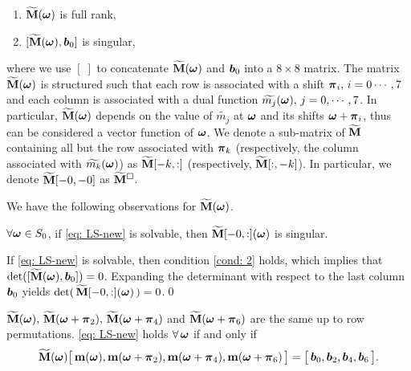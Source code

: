 \begin{enumerate}[leftmargin=.5in]
\item[\mylabel{cond: 1}{(\ref{sec: solve-quincunx}.i)}] $\widetilde{\mathbf{M}}(\boldsymbol{\omega})$ is full rank,
\item[\mylabel{cond: 2}{(\ref{sec: solve-quincunx}.ii)}] $[\widetilde{\mathbf{M}}(\boldsymbol{\omega}), \boldsymbol{b}_0]$ is singular,
\end{enumerate}
where we use $[\;]$ to concatenate $\widetilde{\mathbf{M}}(\boldsymbol{\omega})$ and $\boldsymbol{b}_0$ into a $8\times 8$ matrix. %
The matrix $\widetilde{\mathbf{M}}(\boldsymbol{\omega})$ is structured such that each row is associated with a shift $\boldsymbol{\pi}_i,\,i=0\cdots,7$ and each column is associated with a dual function $\widetilde{m_{j}}(\boldsymbol{\omega}),\,j=0,\cdots,7$. In particular, $\widetilde{\mathbf{M}}(\boldsymbol{\omega})$ depends on the value of $\widetilde{m_j}$ at $\boldsymbol{\omega}$ and its shifts $\boldsymbol{\omega}+\boldsymbol{\pi}_i$, thus can be considered a vector function of $\boldsymbol{\omega}$. We denote a sub-matrix of $\widetilde{\mathbf{M}}$ containing all but the row associated with $\boldsymbol{\pi}_k$ (respectively, the column associated with $\widetilde{m_{k}}(\boldsymbol{\omega})$) as $\widetilde{\mathbf{M}}[-k,:]$ (respectively, $\widetilde{\mathbf{M}}[:,-k]$).
In particular, we denote $\widetilde{\mathbf{M}}[-0,-0]$ as $\widetilde{\mathbf{M}}^{\Box}$.

We have the following observations for $\widetilde{\mathbf{M}}(\boldsymbol{\omega})$.
\begin{lemma}\label{lem: subM-singular}
 $\forall \boldsymbol{\omega}\in S_0$, if \eqref{eq: LS-new} is solvable, then $\widetilde{\mathbf{M}}[-0,:](\boldsymbol{\omega})$ is singular.
\end{lemma}
If \eqref{eq: LS-new} is solvable, then condition \ref{cond: 2} holds, which implies that $\det([\widetilde{\mathbf{M}}(\boldsymbol{\omega}),\boldsymbol{b}_0]) = 0$. Expanding the determinant with respect to the last column $\boldsymbol{b}_0$ yields $\det(\,\widetilde{\mathbf{M}}[-0,:](\boldsymbol{\omega})\,) = 0$.\qed

\begin{lemma}\label{lem: M-symmetry}
$\widetilde{\mathbf{M}}(\boldsymbol{\omega}),\,\widetilde{\mathbf{M}}(\boldsymbol{\omega}+\boldsymbol{\pi}_2),\,\widetilde{\mathbf{M}}(\boldsymbol{\omega}+\boldsymbol{\pi}_4)$ and $\widetilde{\mathbf{M}}(\boldsymbol{\omega}+\boldsymbol{\pi}_6)$ are the same up to row permutations. \eqref{eq: LS-new} holds $\forall \, \boldsymbol{\omega}$ if and only if 
\begin{align*}
\widetilde{\mathbf{M}}(\boldsymbol{\omega}) \big[\,\mathbf{m}(\boldsymbol{\omega}),\mathbf{m}(\boldsymbol{\omega}+\boldsymbol{\pi}_2),\mathbf{m}(\boldsymbol{\omega}+\boldsymbol{\pi}_4),\mathbf{m}(\boldsymbol{\omega}+\boldsymbol{\pi}_6)\,\big] = \big[\,\boldsymbol{b}_0,\boldsymbol{b}_2,\boldsymbol{b}_4,\boldsymbol{b}_6\,\big].
\end{align*}
\end{lemma}

